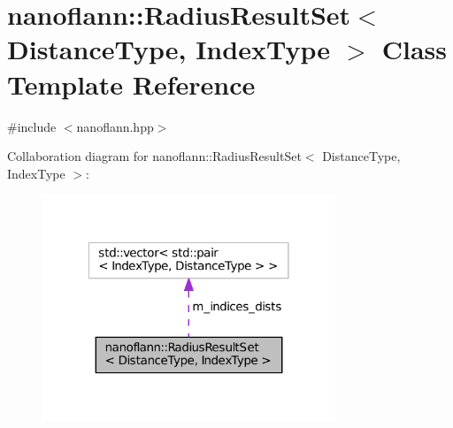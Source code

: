 \hypertarget{classnanoflann_1_1_radius_result_set}{\section{nanoflann\-:\-:Radius\-Result\-Set$<$ Distance\-Type, Index\-Type $>$ Class Template Reference}
\label{classnanoflann_1_1_radius_result_set}
}


{\ttfamily \#include $<$nanoflann.\-hpp$>$}



Collaboration diagram for nanoflann\-:\-:Radius\-Result\-Set$<$ Distance\-Type, Index\-Type $>$\-:
\nopagebreak
\begin{figure}[H]
\begin{center}
\leavevmode
\includegraphics[width=248pt]{classnanoflann_1_1_radius_result_set__coll__graph}
\end{center}
\end{figure}
